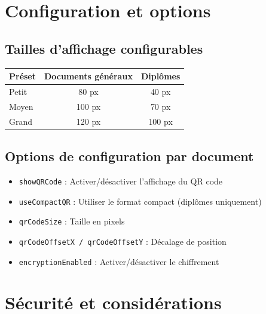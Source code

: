 \documentclass[a4paper,11pt]{article}
\begin{document}
\section{Configuration et options}

\subsection{Tailles d'affichage configurables}

\begin{center}
\begin{tabular}{lcc}
\toprule
\textbf{Pr\'eset} & \textbf{Documents g\'en\'eraux} & \textbf{Dipl\^omes} \\
\midrule
Petit & 80 px & 40 px \\
Moyen & 100 px & 70 px \\
Grand & 120 px & 100 px \\
\bottomrule
\end{tabular}
\end{center}

\subsection{Options de configuration par document}

\begin{itemize}[noitemsep]
    \item \texttt{showQRCode} : Activer/d\'esactiver l'affichage du QR code
    \item \texttt{useCompactQR} : Utiliser le format compact (dipl\^omes uniquement)
    \item \texttt{qrCodeSize} : Taille en pixels
    \item \texttt{qrCodeOffsetX / qrCodeOffsetY} : D\'ecalage de position
    \item \texttt{encryptionEnabled} : Activer/d\'esactiver le chiffrement
\end{itemize}

\section{S\'ecurit\'e et consid\'erations}
\end{document}
